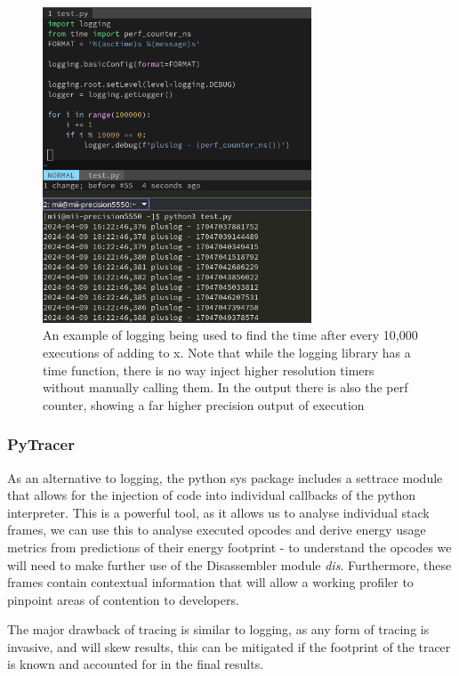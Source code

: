\begin{figure}[H]
    \centering
    \includegraphics[width=8cm]{figures/introduction/python_log_time}
    \caption{An example of logging being used to find the time after every 10,000 executions of adding to x. Note that
    while the logging library has a time function, there is no way inject higher resolution timers without manually
    calling them. In the output there is also the perf counter, showing a far higher precision output of execution}
    \label{fig:python_log_time}
\end{figure}

\subsubsection{PyTracer}
As an alternative to logging, the python sys package includes a settrace module\cite{PythonSystrace} that allows for the
injection of code into individual callbacks of the python interpreter.
This is a powerful tool, as it allows us to analyse individual stack frames, we can use this to analyse executed opcodes
and derive energy usage metrics from predictions of their energy footprint - to understand the opcodes we will need
to make further use of the Disassembler module \textit{dis}\cite{PythonDis}.
Furthermore, these frames contain contextual information that will allow a working profiler to pinpoint areas of
contention to developers.

The major drawback of tracing is similar to logging, as any form of tracing is invasive, and will skew results, this can
be mitigated if the footprint of the tracer is known and accounted for in the final results.

